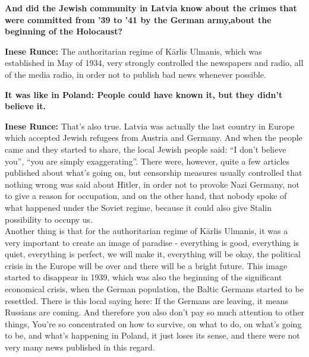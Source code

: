 \textbf{And did the Jewish community in Latvia know about the crimes that were committed from '39 to '41 by the German army,about the beginning of the Holocaust?}

\textbf{Inese Runce:} The authoritarian regime of Kārlis Ulmanis, which was established in May of 1934, very strongly controlled the newspapers and radio, all of the media radio, in order not to publish bad news whenever possible.

\textbf{It was like in Poland: People could have known it, but they didn’t believe it.}

\textbf{Inese Runce:} That’s also true. Latvia was actually the last country in Europe which accepted Jewish refugees from Austria and Germany. And when the people came and they started to share, the local Jewish people said: ``I don’t believe you'', ``you are simply exaggerating''.
There were, however, quite a few articles published about what’s going on, but censorship measures usually controlled that nothing wrong was said about Hitler, in order not to provoke Nazi Germany, not to give a reason for occupation, and on the other hand, that nobody spoke of what happened under the Soviet regime, because it could also give Stalin possibility to occupy us.\\
Another thing is that for the authoritarian regime of Kārlis Ulmanis, it was a very important to create an image of paradise - everything is good, everything is quiet, everything is perfect, we will make it, everything will be okay, the political crisis in the Europe will be over and there will be a bright future. This image started to disappear in 1939, which was also the beginning of the significant economical crisis, when the German population, the Baltic Germans started to be resettled. There is this local saying here: If the Germans are leaving, it means Russians are coming.
And therefore you also don't pay so much attention to other things, You're so concentrated on how to survive, on what to do, on what's going to be, and what's happening in Poland, it just loses its sense, and there were not very many news published in this regard.